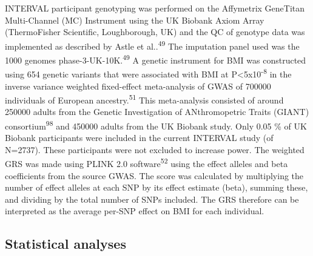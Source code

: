 \documentclass[11pt,twoside]{bristolthesis}
\begin{document}
INTERVAL participant genotyping was performed on the Affymetrix GeneTitan Multi-Channel (MC) Instrument using the UK Biobank Axiom Array (ThermoFisher Scientific, Loughborough, UK) and the QC of genotype data was implemented as described by Astle et al..\textsuperscript{49} The imputation panel used was the 1000 genomes phase-3-UK-10K.\textsuperscript{49} A genetic instrument for BMI was constructed using 654 genetic variants that were associated with BMI at P\textless5x10\textsuperscript{-8} in the inverse variance weighted fixed-effect meta-analysis of GWAS of 700000 individuals of European ancestry.\textsuperscript{51} This meta-analysis consisted of around 250000 adults from the Genetic Investigation of ANthromopetric Traits (GIANT) consortium\textsuperscript{98} and 450000 adults from the UK Biobank study. Only 0.05 \% of UK Biobank participants were included in the current INTERVAL study (of N=2737). These participants were not excluded to increase power. The weighted GRS was made using PLINK 2.0 software\textsuperscript{52} using the effect alleles and beta coefficients from the source GWAS. The score was calculated by multiplying the number of effect alleles at each SNP by its effect estimate (beta), summing these, and dividing by the total number of SNPs included. The GRS therefore can be interpreted as the average per-SNP effect on BMI for each individual.

\hypertarget{statistical-analyses}{%
\subsection{Statistical analyses}\label{statistical-analyses}}
\end{document}
